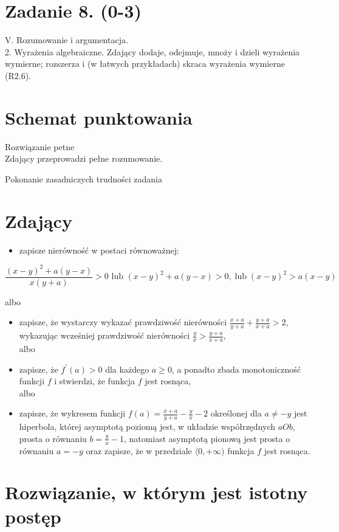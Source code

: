 \documentclass[10pt]{article}
\begin{document}
\section*{Zadanie 8. (0-3)}
V. Rozumowanie i argumentacja.\\
2. Wyrażenia algebraiczne. Zdający dodaje, odejmuje, mnoży i dzieli wyrażenia wymierne; rozszerza i (w łatwych przykładach) skraca wyrażenia wymierne (R2.6).

\section*{Schemat punktowania}
Rozwiązanie petne\\
Zdający przeprowadzi pełne rozumowanie.

Pokonanie zasadniczych trudności zadania

\section*{Zdający}
\begin{itemize}
  \item zapisze nierówność w postaci równoważnej:
\end{itemize}

$$
\frac{(x-y)^{2}+a(y-x)}{x(y+a)}>0 \text { lub }(x-y)^{2}+a(y-x)>0, \operatorname{lub}(x-y)^{2}>a(x-y)
$$

albo

\begin{itemize}
  \item zapisze, że wystarczy wykazać prawdziwość nierówności $\frac{x+a}{y+a}+\frac{y+a}{x+a}>2$, wykazując wcześniej prawdziwość nierówności $\frac{y}{x}>\frac{y+a}{x+a}$,\\
albo
  \item zapisze, że $f^{\prime}(a)>0$ dla każdego $a \geq 0$, a ponadto zbada monotoniczność funkcji $f$ i stwierdzi, że funkcja $f$ jest rosnąca,\\
albo
  \item zapisze, że wykresem funkcji $f(a)=\frac{x+a}{y+a}-\frac{y}{x}-2$ określonej dla $a \neq-y$ jest hiperbola, której asymptotą poziomą jest, w układzie współrzędnych $a O b$, prosta o równaniu $b=\frac{y}{x}-1$, natomiast asymptotą pionową jest prosta o równaniu $a=-y$ oraz zapisze, że w przedziale $\langle 0,+\infty)$ funkcja $f$ jest rosnąca.
\end{itemize}

\section*{Rozwiązanie, w którym jest istotny postęp}
\end{document}
